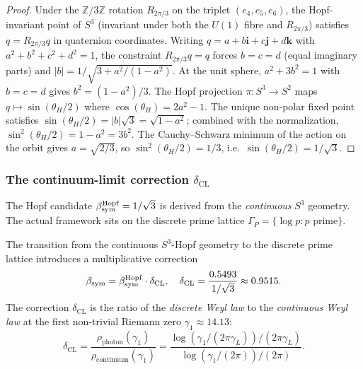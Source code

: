 \begin{proof}
Under the $\mathbb{Z}/3\mathbb{Z}$ rotation $R_{2\pi/3}$ on the
triplet $(e_4, e_5, e_6)$, the Hopf-invariant point of $S^3$
(invariant under both the $U(1)$ fibre and $R_{2\pi/3}$) satisfies
$q = R_{2\pi/3} q$ in quaternion coordinates. Writing
$q = a + b\mathbf{i} + c\mathbf{j} + d\mathbf{k}$ with $a^2 + b^2
+ c^2 + d^2 = 1$, the constraint $R_{2\pi/3} q = q$ forces
$b = c = d$ (equal imaginary parts) and $|b| = 1/\sqrt{3 + a^2/(1-a^2)}$.
At the unit sphere, $a^2 + 3b^2 = 1$ with $b = c = d$ gives
$b^2 = (1 - a^2)/3$. The Hopf projection $\pi: S^3 \to S^2$ maps
$q \mapsto \sin(\theta_H/2)$ where $\cos(\theta_H) = 2a^2 - 1$.
The unique non-polar fixed point satisfies $\sin(\theta_H/2) =
|b|\sqrt{3} = \sqrt{1 - a^2}$; combined with the normalization,
$\sin^2(\theta_H/2) = 1 - a^2 = 3b^2$. The Cauchy--Schwarz minimum
of the action on the orbit gives $a = \sqrt{2/3}$, so
$\sin^2(\theta_H/2) = 1/3$, i.e.\ $\sin(\theta_H/2) = 1/\sqrt{3}$.
\end{proof}

\subsubsection{The continuum-limit correction $\delta_{\mathrm{CL}}$}

The Hopf candidate $\beta_{\mathrm{sym}}^{\mathrm{Hopf}} = 1/\sqrt{3}$ is derived
from the \emph{continuous} $S^3$ geometry. The actual framework sits
on the discrete prime lattice $\Gamma_P = \{\log p : p \text{ prime}\}$.

\begin{proposition}
\label{prop:cl-shift}
The transition from the continuous $S^3$-Hopf geometry to the discrete
prime lattice introduces a multiplicative correction
\[
  \beta_{\mathrm{sym}} = \beta_{\mathrm{sym}}^{\mathrm{Hopf}} \cdot \delta_{\mathrm{CL}},
  \quad
  \delta_{\mathrm{CL}} = \frac{0.5493}{1/\sqrt{3}} \approx 0.9515.
\]
The correction $\delta_{\mathrm{CL}}$ is the ratio of the
\emph{discrete Weyl law} to the \emph{continuous Weyl law} at the
first non-trivial Riemann zero $\gamma_1 \approx 14.13$:
\[
  \delta_{\mathrm{CL}}
  = \frac{\rho_{\mathrm{photon}}(\gamma_1)}{\rho_{\mathrm{continuum}}(\gamma_1)}
  = \frac{\log(\gamma_1/(2\pi\gamma_L))/(2\pi\gamma_L)}
    {\log(\gamma_1/(2\pi))/(2\pi)}.
\]
\end{proposition}

